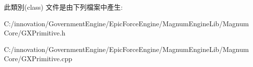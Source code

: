 此類別(class) 文件是由下列檔案中產生\+:\begin{DoxyCompactItemize}
\item 
C\+:/innovation/\+Government\+Engine/\+Epic\+Force\+Engine/\+Magnum\+Engine\+Lib/\+Magnum\+Core/G\+X\+Primitive.\+h\item 
C\+:/innovation/\+Government\+Engine/\+Epic\+Force\+Engine/\+Magnum\+Engine\+Lib/\+Magnum\+Core/G\+X\+Primitive.\+cpp\end{DoxyCompactItemize}
